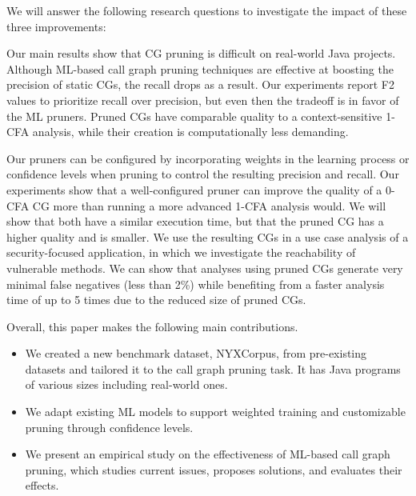 
We will answer the following research questions to investigate the impact of these three improvements:

\begin{description}
%
\item[] \rqOne
%
\item[] \rqTwo
%
\item[] \rqThree
%
\item[] \rqFour
\end{description}

Our main results show that CG pruning is difficult on real-world Java projects.
Although ML-based call graph pruning techniques are effective at boosting the precision of static CGs, the recall drops as a result.
Our experiments report F2 values to prioritize recall over precision, but even then the tradeoff is in favor of the ML pruners.
Pruned CGs have comparable quality to a context-sensitive 1-CFA analysis, while their creation is computationally less demanding.

Our pruners can be configured by incorporating weights in the learning process or confidence levels when pruning to control the resulting precision and recall.
Our experiments show that a well-configured pruner can improve the quality of a 0-CFA CG more than running a more advanced 1-CFA analysis would.
We will show that both have a similar execution time, but that the pruned CG has a higher quality and is smaller.
We use the resulting CGs in a use case analysis of a security-focused application, in which we investigate the reachability of vulnerable methods.
We can show that analyses using pruned CGs generate very minimal false negatives (less than 2\%) while benefiting from a faster analysis time of up to 5 times due to the reduced size of pruned CGs. 

\noindent
Overall, this paper makes the following main contributions.
\begin{itemize}
\item We created a new benchmark dataset, NYXCorpus, from pre-existing datasets and tailored it to the call graph pruning task. It has Java programs of various sizes including real-world ones.
\item We adapt existing ML models to support weighted training and customizable pruning through confidence levels.
\item We present an empirical study on the effectiveness of ML-based call graph pruning, which studies current issues, proposes solutions, and evaluates their effects.
\end{itemize}

